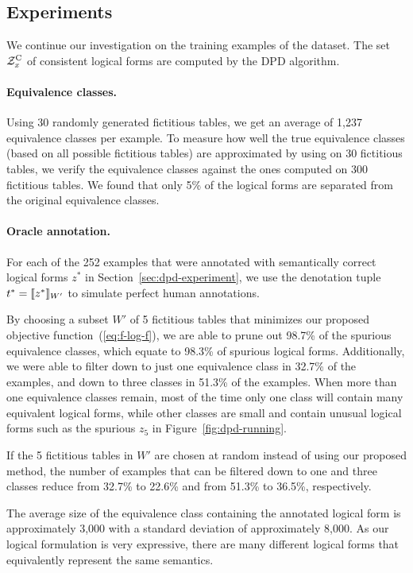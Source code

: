 \subsection{Experiments}
We continue our investigation on the training examples
of the \wtq dataset.
The set $\mathcal{Z}^\mathrm{C}_x$ of consistent logical forms are computed
by the DPD algorithm.

\paragraph{Equivalence classes.}
Using 30 randomly generated fictitious tables,
we get an average of 1,237 equivalence classes per example.
To measure how well the true equivalence classes
(based on all possible fictitious tables)
are approximated by using on 30 fictitious tables,
we verify the equivalence classes against the ones
computed on 300 fictitious tables.
We found that only 5\% of the logical forms are separated
from the original equivalence classes.

\paragraph{Oracle annotation.}
For each of the 252 examples that were annotated
with semantically correct logical forms $z^*$
in Section~\ref{sec:dpd-experiment},
we use the denotation tuple $t^* = \llbracket{z^*}\rrbracket_{W'}$
to simulate perfect human annotations.

By choosing a subset $W'$ of 5 fictitious tables that minimizes
our proposed objective function~(\ref{eq:f-log-f}),
we are able to prune out 98.7\%
of the spurious equivalence classes,
which equate to 98.3\% of spurious logical forms.
Additionally,
we were able to filter down to just one
equivalence class in 32.7\% of the examples,
and down to three classes in 51.3\% of the examples.
When more than one equivalence classes remain,
most of the time only one class will contain many
equivalent logical forms,
while other classes are small and contain
unusual logical forms such as the spurious $z_5$
in Figure~\ref{fig:dpd-running}.

If the 5 fictitious tables in $W'$ are chosen at random
instead of using our proposed method,
the number of examples that can be filtered down to
one and three classes reduce from 32.7\% to 22.6\% and
from 51.3\% to 36.5\%, respectively.

The average size of the equivalence class
containing the annotated logical form
is approximately 3,000
with a standard deviation of approximately 8,000.
As our logical formulation is very expressive,
there are many different logical forms
that equivalently represent the same semantics.

